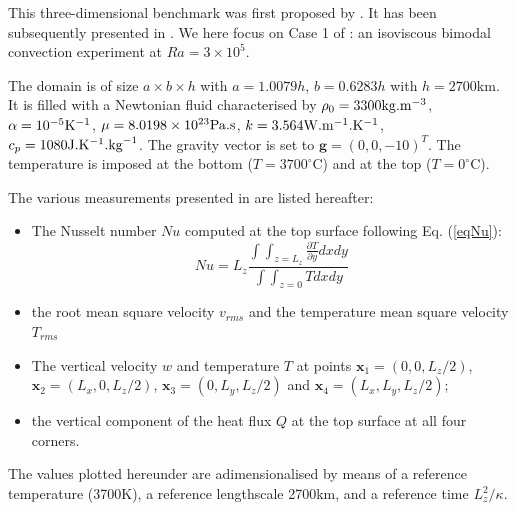 
This three-dimensional benchmark was first proposed by \cite{bucc93}. 
It has been subsequently presented in \cite{tack94,trha98,albe00,omma06,dawk11,krhb12}.
We here focus on Case 1 of \cite{bucc93}:  an isoviscous bimodal convection experiment at $Ra=3\times 10^5$.

The domain is of size $a\times b\times h$ with $a=1.0079h$, $b=0.6283h$ with $h=2700$km. It is filled with a Newtonian fluid
characterised by $\rho_0=3300{\rm kg}.{\rm m}^{-3}$, $\alpha=10^{-5}{\rm K}^{-1}$, $\mu=8.0198\times10^{23}{\rm Pa.s}$, 
$k=3.564{\rm W}.{\rm m}^{-1}.{\rm K}^{-1}$, 
$c_p=1080{\rm J}.{\rm K}^{-1}.{\rm kg}^{-1}$.
The gravity vector is set to ${\bm g}=(0,0,-10)^T$.
The temperature is imposed at the bottom  ($T=3700^\circ$C) and at the top ($T=0^\circ$C).

The various measurements presented in \cite{bucc93} are listed hereafter:
\begin{itemize}
\item The Nusselt number $Nu$ computed at the top surface following Eq. (\ref{eqNu}):
\[
Nu = L_z \frac{\int\int_{z=L_z} \frac{\partial T}{\partial y} dx dy  }{\int \int_{z=0} T dx dy}
\]
\item the root mean square velocity $v_{rms}$ and the temperature mean square velocity $T_{rms}$
\item The vertical velocity $w$ and temperature $T$ at points ${\bm x}_1=(0,0,L_z/2)$, ${\bm x}_2=(L_x,0,L_z/2)$,
${\bm x}_3=(0,L_y,L_z/2)$ and ${\bm x}_4=(L_x,L_y,L_z/2)$;
\item the vertical component of the heat flux $Q$ at the top surface  at all four corners.
\end{itemize}

The values plotted hereunder are adimensionalised by means of a reference temperature (3700K),
a reference lengthscale 2700km, and a reference time $L_z^2/\kappa$. 

